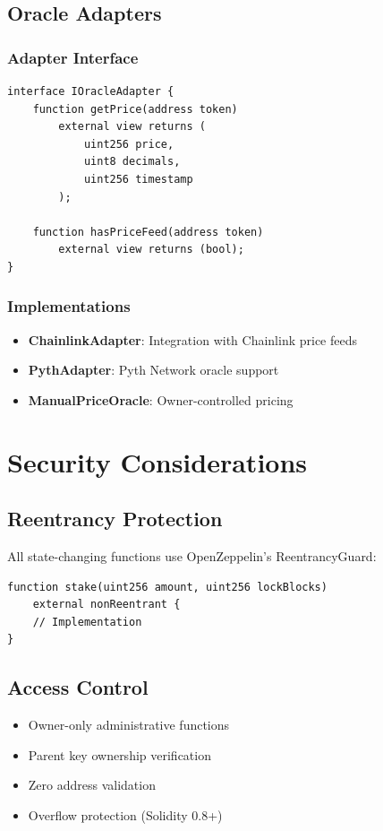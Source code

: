\documentclass[11pt,a4paper]{article}
\begin{document}
\subsection{Oracle Adapters}

\subsubsection{Adapter Interface}

\begin{lstlisting}
interface IOracleAdapter {
    function getPrice(address token) 
        external view returns (
            uint256 price,
            uint8 decimals,
            uint256 timestamp
        );
    
    function hasPriceFeed(address token) 
        external view returns (bool);
}
\end{lstlisting}

\subsubsection{Implementations}
\begin{itemize}
\item \textbf{ChainlinkAdapter}: Integration with Chainlink price feeds
\item \textbf{PythAdapter}: Pyth Network oracle support
\item \textbf{ManualPriceOracle}: Owner-controlled pricing
\end{itemize}

\section{Security Considerations}

\subsection{Reentrancy Protection}
All state-changing functions use OpenZeppelin's ReentrancyGuard:
\begin{lstlisting}
function stake(uint256 amount, uint256 lockBlocks) 
    external nonReentrant {
    // Implementation
}
\end{lstlisting}

\subsection{Access Control}
\begin{itemize}
\item Owner-only administrative functions
\item Parent key ownership verification
\item Zero address validation
\item Overflow protection (Solidity 0.8+)
\end{itemize}
\end{document}
